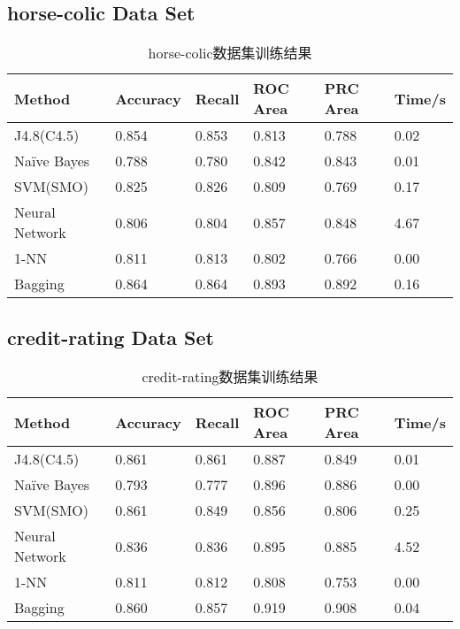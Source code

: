 \documentclass[a4paper,UTF8]{article}
\numberwithin{equation}{section}
\begin{document}
\subsection{horse-colic Data Set}

\begin{table}[H]
\centering
\caption{horse-colic数据集训练结果}
\label{my-label}
\begin{tabular}{l|lllll}
\hline
Method         & Accuracy & Recall & ROC Area & PRC Area & Time/s \\ \hline
J4.8(C4.5)     & 0.854    & 0.853  & 0.813    & 0.788    & 0.02   \\ \hline
Naïve Bayes   & 0.788    & 0.780  & 0.842    & 0.843    & 0.01   \\ \hline
SVM(SMO)       & 0.825    & 0.826  & 0.809    & 0.769    & 0.17   \\ \hline
Neural Network & 0.806    & 0.804  & 0.857    & 0.848    & 4.67   \\ \hline
1-NN           & 0.811    & 0.813  & 0.802    & 0.766    & 0.00   \\ \hline
Bagging        & 0.864    & 0.864  & 0.893    & 0.892    & 0.16   \\ \hline
\end{tabular}
\end{table}

\subsection{credit-rating Data Set}

\begin{table}[H]
\centering
\caption{credit-rating数据集训练结果}
\label{my-label}
\begin{tabular}{l|lllll}
\hline
Method         & Accuracy & Recall & ROC Area & PRC Area & Time/s \\ \hline
J4.8(C4.5)     & 0.861    & 0.861  & 0.887    & 0.849    & 0.01   \\ \hline
Naïve Bayes   & 0.793    & 0.777  & 0.896    & 0.886    & 0.00   \\ \hline
SVM(SMO)       & 0.861    & 0.849  & 0.856    & 0.806    & 0.25   \\ \hline
Neural Network & 0.836    & 0.836  & 0.895    & 0.885    & 4.52   \\ \hline
1-NN           & 0.811    & 0.812  & 0.808    & 0.753    & 0.00   \\ \hline
Bagging        & 0.860    & 0.857  & 0.919    & 0.908    & 0.04   \\ \hline
\end{tabular}
\end{table}
\end{document}
